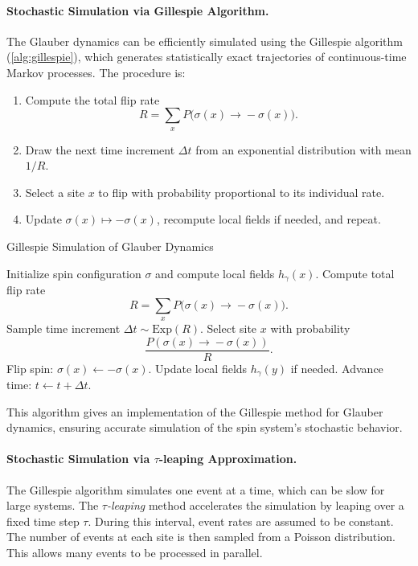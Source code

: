 \documentclass[11pt,a4paper]{article}
\begin{document}
\paragraph{Stochastic Simulation via Gillespie Algorithm.}
The Glauber dynamics can be efficiently simulated using the Gillespie algorithm (\cref{alg:gillespie}), 
which generates statistically exact trajectories of continuous-time Markov processes. 
The procedure is:

\begin{enumerate}
    \item Compute the total flip rate 
    \begin{equation}
        R = \sum_{x} P\big(\sigma(x)\!\to\!-\sigma(x)\big).
    \end{equation}
    \item Draw the next time increment $\Delta t$ from an exponential distribution with mean $1/R$.
    \item Select a site $x$ to flip with probability proportional to its individual rate.
    \item Update $\sigma(x)\mapsto -\sigma(x)$, recompute local fields if needed, and repeat.
\end{enumerate}

\begin{algorithm}[h!]
\caption{Gillespie Simulation of Glauber Dynamics}
\label{alg:gillespie}
\begin{algorithmic}[1]
\State Initialize spin configuration $\sigma$ and compute local fields $h_\gamma(x)$.
    \State Compute total flip rate 
    \[
        R = \sum_{x} P\big(\sigma(x)\!\to\!-\sigma(x)\big).
    \]
    \State Sample time increment $\Delta t \sim \mathrm{Exp}(R)$.
    \State Select site $x$ with probability 
    \[
        \frac{P(\sigma(x)\!\to\!-\sigma(x))}{R}.
    \]
    \State Flip spin: $\sigma(x) \gets -\sigma(x)$.
    \State Update local fields $h_\gamma(y)$ if needed.
    \State Advance time: $t \gets t + \Delta t$.
\EndWhile
\end{algorithmic}
\end{algorithm}
This algorithm gives an implementation of the Gillespie method for Glauber dynamics, ensuring accurate simulation of the spin system's stochastic behavior.

\paragraph{Stochastic Simulation via $\tau$-leaping Approximation.} The Gillespie algorithm simulates one event at a time, which can be slow for large systems. 
The \emph{$\tau$-leaping} method accelerates the simulation by leaping over a fixed time step $\tau$. 
During this interval, event rates are assumed to be constant. 
The number of events at each site is then sampled from a Poisson distribution. 
This allows many events to be processed in parallel.
\end{document}
